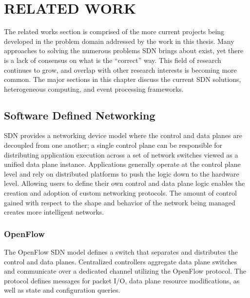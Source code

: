 \chapter{RELATED WORK}
\label{related}
The related works section is comprised of the more current projects being
developed in the problem domain addressed by the work in this thesis. Many
approaches to solving the numerous problems SDN brings about exist, yet there
is a lack of consensus on what is the ``correct'' way. This field of research
continues to grow, and overlap with other research interests is becoming more
common. The major sections in this chapter discuss the current SDN solutions,
heterogeneous computing, and event processing frameworks.

\section{Software Defined Networking}
\label{related:sdn}
SDN provides a networking device model where the control and data planes are
decoupled from one another; a single control plane can be responsible for
distributing application execution across a set of network switches viewed as
a unified data plane instance. Applications generally operate at the control
plane level and rely on distributed platforms to push the logic down to the
hardware level. Allowing users to define their own control and data plane
logic enables the creation and adoption of custom networking protocols. The
amount of control gained with respect to the shape and behavior of the network
being managed creates more intelligent networks.


\subsection{OpenFlow}
\label{related:of}
The OpenFlow \cite{openflow} SDN model defines a switch that separates and
distributes the control and data planes. Centralized controllers aggregate
data plane switches and communicate over a dedicated channel utilizing the
OpenFlow protocol. The protocol defines messages for packet I/O, data plane
resource modifications, as well as state and configuration queries.

